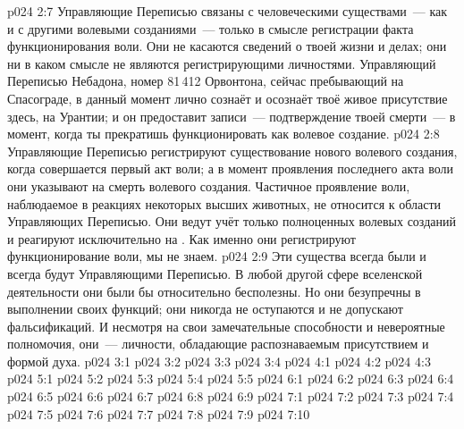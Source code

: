 \vs p024 2:7 \pc Управляющие Переписью связаны с человеческими существами~--- как и с другими волевыми созданиями~--- только в смысле регистрации факта функционирования воли. Они не касаются сведений о твоей жизни и делах; они ни в каком смысле не являются регистрирующими личностями. Управляющий Переписью Небадона, номер 81\,412 Орвонтона, сейчас пребывающий на Спасограде, в данный момент лично сознаёт и осознаёт твоё живое присутствие здесь, на Урантии; и он предоставит записи~--- подтверждение твоей смерти~--- в момент, когда ты прекратишь функционировать как волевое создание.
\vs p024 2:8 Управляющие Переписью регистрируют существование нового волевого создания, когда совершается первый акт воли; а в момент проявления последнего акта воли они указывают на смерть волевого создания. Частичное проявление воли, наблюдаемое в реакциях некоторых высших животных, не относится к области Управляющих Переписью. Они ведут учёт только полноценных волевых созданий и реагируют исключительно на . Как именно они регистрируют функционирование воли, мы не знаем.
\vs p024 2:9 Эти существа всегда были и всегда будут Управляющими Переписью. В любой другой сфере вселенской деятельности они были бы относительно бесполезны. Но они безупречны в выполнении своих функций; они никогда не оступаются и не допускают фальсификаций. И несмотря на свои замечательные способности и невероятные полномочия, они~--- личности, обладающие распознаваемым присутствием и формой духа.
\vs p024 3:1 
\vs p024 3:2 
\vs p024 3:3 
\vs p024 3:4 
\vs p024 4:1 
\vs p024 4:2 
\vs p024 4:3 
\vs p024 5:1 
\vs p024 5:2 
\vs p024 5:3 
\vs p024 5:4 
\vs p024 5:5 \pc 
{}
\vs p024 6:1 
\vs p024 6:2 
\vs p024 6:3 
\vs p024 6:4 \pc 
\vs p024 6:5 
\vs p024 6:6 
\vs p024 6:7 
\vs p024 6:8 \pc 
\vs p024 6:9 \pc 
{}
\vs p024 7:1 
\vs p024 7:2 
\vs p024 7:3 
\vs p024 7:4 \pc 
\vs p024 7:5 
\vs p024 7:6 
\vs p024 7:7 \pc 
\vs p024 7:8 \pc 
\vs p024 7:9 
\vsetoff
\vs p024 7:10 
\quizlink
